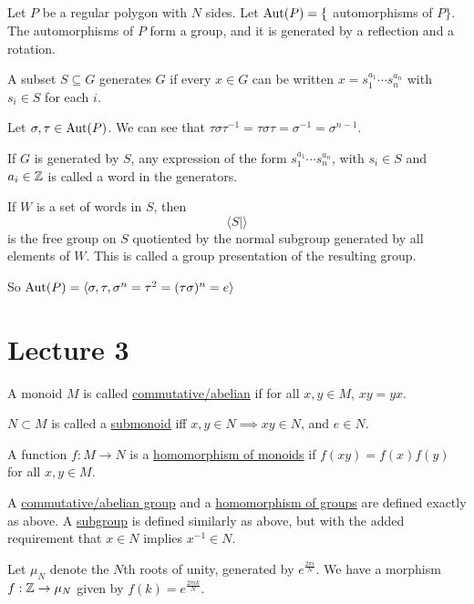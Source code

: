 \documentclass[x11names,reqno,14pt]{extarticle}
\begin{document}
\subsection*{}

Let $P$ be a regular polygon with $N$ sides. Let ${\mathrm{Aut}}(P) = \{$ automorphisms of $P\}$. The automorphisms of $P$ form a group, and it is generated by a reflection and a rotation. 


A subset $S \subseteq G$ generates $G$ if every $x \in G$ can be written $x = s_1^{a_1}\cdots s_n^{a_n}$ with $s_i \in S$ for each $i$. 

Let $\sigma, \tau \in {\mathrm{Aut}}(P)$. We can see that $\tau\sigma\tau^{-1} = \tau\sigma\tau = \sigma^{-1} = \sigma^{n - 1}$. 

If $G$ is generated by $S$, any expression of the form $s_1^{a_1}\cdots s_n^{a_n}$, with $s_i \in S$ and $a_i \in \mathbb{Z}$ is called a word in the generators. 

If $W$ is a set of words in $S$, then 
\[
\langle S \mid \rangle
\]
is the free group on $S$ quotiented by the normal subgroup generated by all elements of $W$. This is called a group presentation of the resulting group. 

So ${\mathrm{Aut}}(P) = \langle \sigma, \tau, \sigma^n = \tau^2 = (\tau\sigma)^n = e\rangle$

\section*{Lecture 3}


A monoid $M$ is called \underline{commutative/abelian} if  for all $x, y \in M$, $xy = yx$. 

$N\subset M$ is called a \underline{submonoid} iff $x,y \in N\implies xy \in N$, and $e \in N$. 

A function $f:M\to N$ is a \underline{homomorphism of monoids} if $f(xy) = f(x)f(y)$ for all $x, y \in M$. 


A \underline{commutative/abelian group} and a \underline{homomorphism of groups} are defined exactly as above. A \underline{subgroup} is defined similarly as above, but with the added requirement that $x\in N$ implies $x^{-1}\in N$. 

\exm

Let $\mu_N$ denote the $N$th roots of unity, generated by $e^{\frac{2\pi i}{N}}.$ We have a morphism $f:\mathbb{Z}\to\mu_N$ given by $f(k) = e^{\frac{2\pi ik}{N}}$. 
\end{document}
